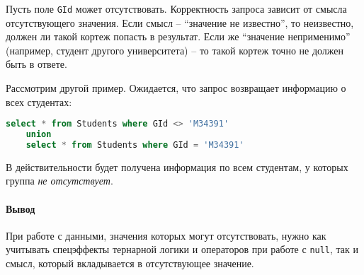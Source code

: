 Пусть поле \texttt{GId} может отсутствовать. Корректность запроса зависит от смысла
отсутствующего значения. Если смысл -- ``значение не известно'', то неизвестно, должен ли такой
кортеж попасть в результат. Если же ``значение неприменимо'' (например, студент другого
университета) -- то такой кортеж точно не должен быть в ответе.

Рассмотрим другой пример. Ожидается, что запрос возвращает информацию о всех студентах:

\begin{lstlisting}[language=SQL]
    select * from Students where GId <> 'M34391'
    union
    select * from Students where GId = 'M34391'
\end{lstlisting}

В действительности будет получена информация по всем студентам, у которых группа
\textit{не отсутствует}.

\paragraph{Вывод}

При работе с данными, значения которых могут отсутствовать, нужно как учитывать спецэффекты
тернарной логики и операторов при работе с \texttt{null}, так и смысл, который
вкладывается в отсутствующее значение.
